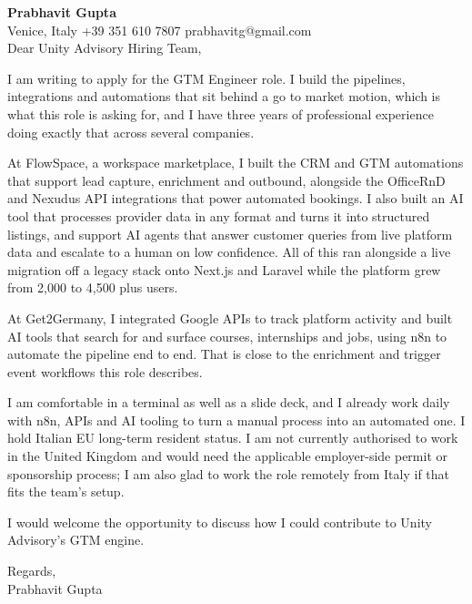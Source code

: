 \documentclass[a4paper,10.5pt]{article}
\begin{document}
\textbf{Prabhavit Gupta}\\
Venice, Italy \textbar{} +39 351 610 7807 \textbar{} prabhavitg@gmail.com\\[10pt]
Dear Unity Advisory Hiring Team,

I am writing to apply for the GTM Engineer role. I build the pipelines, integrations and automations that sit behind a go to market motion, which is what this role is asking for, and I have three years of professional experience doing exactly that across several companies.

At FlowSpace, a workspace marketplace, I built the CRM and GTM automations that support lead capture, enrichment and outbound, alongside the OfficeRnD and Nexudus API integrations that power automated bookings. I also built an AI tool that processes provider data in any format and turns it into structured listings, and support AI agents that answer customer queries from live platform data and escalate to a human on low confidence. All of this ran alongside a live migration off a legacy stack onto Next.js and Laravel while the platform grew from 2,000 to 4,500 plus users.

At Get2Germany, I integrated Google APIs to track platform activity and built AI tools that search for and surface courses, internships and jobs, using n8n to automate the pipeline end to end. That is close to the enrichment and trigger event workflows this role describes.

I am comfortable in a terminal as well as a slide deck, and I already work daily with n8n, APIs and AI tooling to turn a manual process into an automated one. I hold Italian EU long-term resident status. I am not currently authorised to work in the United Kingdom and would need the applicable employer-side permit or sponsorship process; I am also glad to work the role remotely from Italy if that fits the team's setup.

I would welcome the opportunity to discuss how I could contribute to Unity Advisory's GTM engine.

Regards,\\
Prabhavit Gupta
\end{document}
